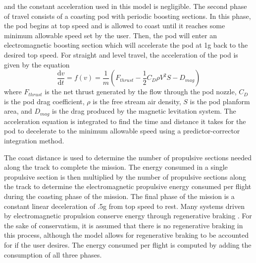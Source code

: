 	and the constant acceleration used in this model is negligible.
	The second phase of travel consists of a coasting pod with periodic boosting sections.
	In this phase, the pod begins at top speed and is allowed to coast until it
	reaches some minimum allowable speed set by the user.
	Then, the pod will enter an electromagnetic boosting section which will
	accelerate the pod at 1g back to the desired top speed.
	For straight and level travel, the acceleration of the pod is given by the equation
	\begin{equation}
		\label{eq:acceleration}
		\frac{\mathrm{d} v}{\mathrm{d} t} = f ( v  ) = \frac{1}{m} ( F_{thrust} - \frac{1}{2}C_{D}\rho V^{2}S - D_{mag})
	\end{equation}
	where $F_{thrust}$ is the net thrust generated by the flow through the pod
	nozzle, $C_D$ is the pod drag coefficient, $\rho$ is the free stream air
	density, $S$ is the pod planform area, and $D_{mag}$ is the drag produced
	by the magnetic levitation system. The acceleration equation is integrated
	to find the time and distance it takes for the pod to decelerate to the
	minimum allowable speed using a predictor-corrector integration method.
	
  The coast distance is used to determine the number of propulsive sections
	needed along the track to complete the mission. The energy consumed in a
	single propulsive section is then multiplied by the number of propulsive
	sections along the track to determine the electromagnetic propulsive energy
	consumed per flight during the coasting phase of the mission. The final
	phase of the mission is a constant linear deceleration of .5g from top
	speed to rest. Many systems driven by electromagnetic propulsion conserve
	energy through regenerative braking \cite{inductrack}. For the sake of
	conservatism, it is assumed that there is no regenerative braking in this
	process, although the model allows for regenerative braking to be
	accounted for if the user desires. The energy consumed per flight is
	computed by adding the consumption of all three phases.

